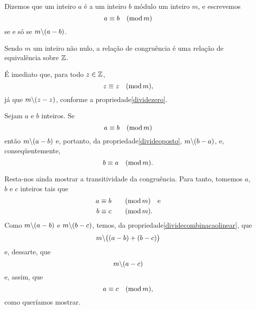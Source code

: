 \begin{Def}
  Dizemos que um inteiro $a$ é  a um
  inteiro $b$ módulo um inteiro $m$, e escrevemos
  \begin{equation*}
    \simb[congruência entre $a$ e $b$ módulo $m$]{\congmod{a}{b}{m}}
  \end{equation*}
  se e só se $m\backslash (a-b)$.
\end{Def}

\begin{Teo}
  Sendo $m$ um inteiro não nulo,
  a relação de congruência é uma relação de
  equivalência sobre $\mathbb{Z}$.
\end{Teo}

\begin{dem}
  É imediato que, para todo $z\in\mathbb{Z}$,
  \begin{equation*}
    \congmod{z}{z}{m}\MMv
  \end{equation*}
  já que $m\backslash(z-z)$, conforme a
  propriedade\xspace\ref{dividezero}.

  Sejam $a$ e $b$ inteiros. Se
  \begin{equation*}
    \congmod{a}{b}{m}
  \end{equation*}
  então $m\backslash (a-b)$ e, portanto, da
  propriedade\xspace\ref{divideoposto}, $m\backslash(b-a)$, e,
  conseqüentemente,
  \begin{equation*}
    \congmod{b}{a}{m}\MMp
  \end{equation*}

  Resta-nos ainda mostrar a transitividade da congruência. Para
  tanto, tomemos $a$, $b$ e $c$ inteiros tais que
  \begin{equation*}
    \begin{aligned}
      \congmoda{a}{b}{m}\quad\text{e}\\
      \congmoda{b}{c}{m}\MMp
    \end{aligned}
  \end{equation*}
  Como $m\backslash (a-b)$ e $m\backslash (b-c)$, temos, da
  propriedade\xspace\ref{dividecombinacaolinear}, que
  \begin{equation*}
    m\backslash\bigl((a-b)+(b-c)\bigr)
  \end{equation*}
  e, dessarte, que
  \begin{equation*}
    m\backslash(a-c)
  \end{equation*}
  e, assim, que
  \begin{equation*}
    \congmod{a}{c}{m}\MMv
  \end{equation*}
  como queríamos mostrar.
\end{dem}

